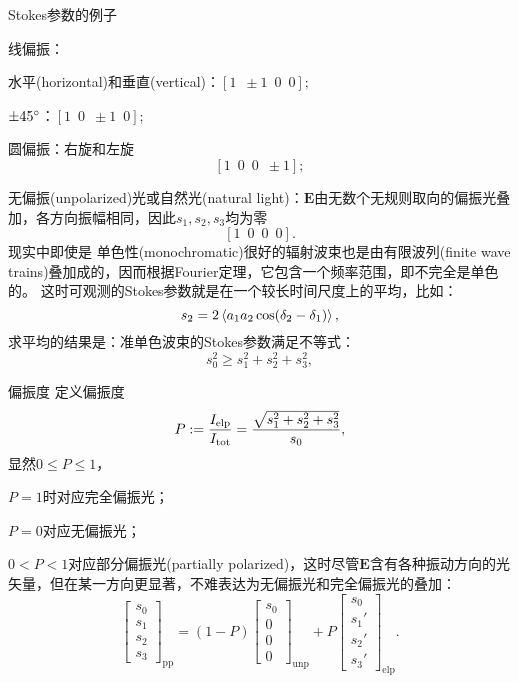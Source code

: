 \begin{example}{Stokes参数的例子}{}
    \begin{compactitem}
    	\item 线偏振：
        \begin{compactitem}
            \item 水平(horizontal)和垂直(vertical)：$[1\enspace\pm 1\enspace0\enspace0];$
            \item $\pm 45^\circ$：$[1\enspace0\enspace\pm 1\enspace0];$
        \end{compactitem}
    	\item 圆偏振：右旋和左旋
    	\[
            [1\enspace0\enspace0\enspace\pm 1];
        \]
    	\item 无偏振(unpolarized)光或自然光(natural light)：$\bm E$由无数个无规则取向的偏振光叠加，各方向振幅相同，因此$s_1,s_2,s_3$均为零
        \[
            [1\enspace0\enspace0\enspace0].
        \]
        现实中即使是%
        单色性(monochromatic)很好的辐射波束也是由有限波列(finite wave trains)叠加成的，因而根据Fourier定理，它包含一个频率范围，即不完全是单色的。%
        这时可观测的Stokes参数就是在一个较长时间尺度上的平均，比如：
        \[
            s_2=2\left\langle a_1a_2\cos(\mathop{}\!\delta_2-\mathop{}\!\delta_1)\right\rangle,
        \]
        求平均的结果是：准单色波束的Stokes参数满足不等式：
        \[
            s_0^2\geqslant s_1^2+s_2^2+s_3^2,
        \]
    \end{compactitem}
\end{example}

\begin{definition}{偏振度}{}
    定义偏振度
    \[
        P:=\frac{I_\text{elp}}{I_\mathrm{tot}}=\frac{\sqrt{s_1^2+s_2^2+s_3^2}}{s_0},
    \]
    显然$0\leqslant P\leqslant 1$，
\end{definition}
\begin{compactitem}
	\item $P=1$时对应完全偏振光；
	\item $P=0$对应无偏振光；
	\item $0<P<1$对应部分偏振光(partially polarized)，这时尽管$\bm E$含有各种振动方向的光矢量，但在某一方向更显著，不难表达为无偏振光和完全偏振光的叠加：
    \[
        \begin{bmatrix}
            s_0\\s_1\\s_2\\s_3
        \end{bmatrix}_\text{pp}=(1-P)
        \begin{bmatrix}
            s_0\\0\\0\\0
        \end{bmatrix}_\text{unp}+P
        \begin{bmatrix}
            s_0\\s_1'\\s_2'\\s_3'
        \end{bmatrix}_\text{elp}.
    \]
\end{compactitem}

